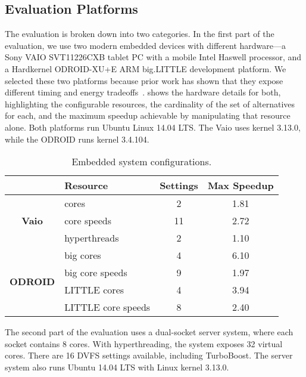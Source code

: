 \subsection{Evaluation Platforms}

The evaluation is broken down into two categories.
In the first part of the evaluation, we use two modern embedded devices with different hardware---a Sony VAIO SVT11226CXB tablet PC with a mobile Intel Haswell processor, and a Hardkernel ODROID-XU+E ARM big.LITTLE development platform.
We selected these two platforms because prior work has shown that they expose different timing and energy tradeoffs~\cite{Imes2014}.
 shows the hardware details for both, highlighting the configurable resources, the cardinality of the set of alternatives for each, and the maximum speedup achievable by manipulating that resource alone.
Both platforms run Ubuntu Linux 14.04 LTS.
The Vaio uses kernel 3.13.0, while the ODROID runs kernel 3.4.104.

\begin{table}[t]
\caption{Embedded system configurations.}
\centering
\begin{tabular}{clcc}
  & \textbf{Resource} & \textbf{Settings} & \textbf{Max Speedup} \\
\hline
\hline
  \multirow{3}{*}{\begin{turn}{90}\textbf{Vaio}\end{turn}} 
  & cores        &  2 & 1.81 \\
  & core speeds  & 11 & 2.72 \\
  & hyperthreads &  2 & 1.10 \\ 
\hline
\hline
  \multirow{4}{*}{\begin{turn}{90}\textbf{ODROID}\end{turn}} 
  & big cores          & 4 & 6.10 \\
  & big core speeds    & 9 & 1.97 \\
  & LITTLE cores       & 4 & 3.94 \\
  & LITTLE core speeds & 8 & 2.40 \\
\hline
\hline
\end{tabular}
\label{tbl:poet-embedded-systemknobs}
\end{table}

The second part of the evaluation uses a dual-socket server system, where each socket contains 8 cores.
With hyperthreading, the system exposes 32 virtual cores.
There are 16 DVFS settings available, including TurboBoost.
The server system also runs Ubuntu 14.04 LTS with Linux kernel 3.13.0.

